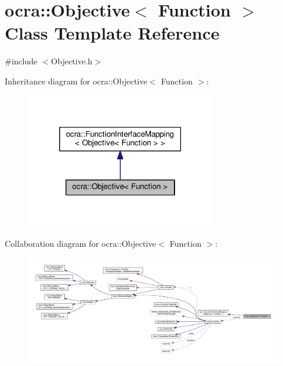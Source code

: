 \hypertarget{classocra_1_1Objective_3_01Function_01_4}{}\section{ocra\+:\+:Objective$<$ Function $>$ Class Template Reference}
\label{classocra_1_1Objective_3_01Function_01_4}


{\ttfamily \#include $<$Objective.\+h$>$}



Inheritance diagram for ocra\+:\+:Objective$<$ Function $>$\+:
\nopagebreak
\begin{figure}[H]
\begin{center}
\leavevmode
\includegraphics[width=234pt]{d7/d76/classocra_1_1Objective_3_01Function_01_4__inherit__graph}
\end{center}
\end{figure}


Collaboration diagram for ocra\+:\+:Objective$<$ Function $>$\+:
\nopagebreak
\begin{figure}[H]
\begin{center}
\leavevmode
\includegraphics[width=350pt]{dc/ddf/classocra_1_1Objective_3_01Function_01_4__coll__graph}
\end{center}
\end{figure}
